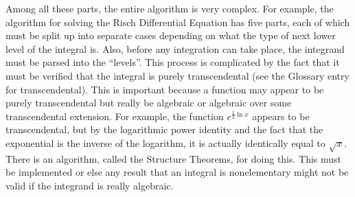 Among all these parts, the entire algorithm is very complex.  For
example, the algorithm for solving the Risch Differential Equation has
five parts, each of which must be split up into separate cases depending
on what the type of next lower level of the integral is. Also, before
any \gls{integration} can take place, the \gls{integrand} must be parsed
into the ``levels''.  This process is complicated by the fact that it
must be verified that the integral is purely \gls{transcendental} (see
the Glossary entry for \gls{transcendental}).  This is important because
a function may appear to be purely \gls{transcendental} but really be
\gls{algebraic} or \gls{algebraic} over some \gls{transcendental}
extension.  For example, the function $e^{\frac{1}{2}\ln{x}}$ appears to
be transcendental, but by the logarithmic power identity and the fact
that the exponential is the inverse of the logarithm, it is actually
identically equal to $\sqrt{x}$.  There is an algorithm, called the
Structure Theorems, for doing this.  This must be implemented or else
any result that an integral is nonelementary might not be valid if the
\gls{integrand} is really \gls{algebraic}.  
